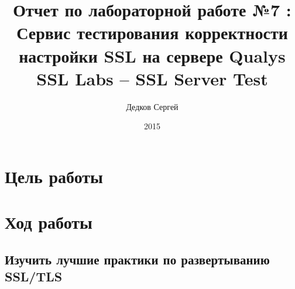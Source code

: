 \documentclass[11pt, a4paper]{article}		%
\author{Дедков Сергей}
\title{Отчет по лабораторной работе №7 :\\ Сервис тестирования корректности настройки SSL на сервере Qualys SSL Labs – SSL Server Test}
\date{2015}
\begin{document}
\maketitle
\tableofcontents
\newpage



\section{Цель работы}



\section{Ход работы}



\subsection{Изучить лучшие практики по развертыванию SSL/TLS}
\end{document}

